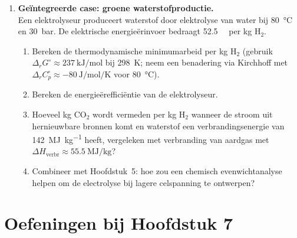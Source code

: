 \begin{enumerate}
\item \textbf{Ge\"integreerde case: groene waterstofproductie.} \\
Een elektrolyseur produceert waterstof door elektrolyse van water bij \SI{80}{\celsius} en \SI{30}{\bar}. De elektrische energie\"erinvoer bedraagt \SI{52.5}{\kilo\watthour} per kg $\mathrm{H_2}$.
\begin{enumerate}
\item[(a)] Bereken de thermodynamische minimumarbeid per kg $\mathrm{H_2}$ (gebruik $\Delta_r G^\circ \approx \SI{237}{\kilo\joule\per\mole}$ bij \SI{298}{\kelvin}; neem een benadering via Kirchhoff met $\Delta_r C_p^\circ \approx -\SI{80}{\joule\per\mole\per\kelvin}$ voor \SI{80}{\celsius}).
\item[(b)] Bereken de energie\"ereffici\"entie van de elektrolyseur.
\item[(c)] Hoeveel kg $\mathrm{CO_2}$ wordt vermeden per kg $\mathrm{H_2}$ wanneer de stroom uit hernieuwbare bronnen komt en waterstof een verbrandingsenergie van \SI{142}{\mega\joule\per\kilogram} heeft, vergeleken met verbranding van aardgas met $\Delta H_{\text{verbr}} \approx \SI{55.5}{\mega\joule\per\kilogram}$?
\item[(d)] Combineer met Hoofdstuk~5: hoe zou een chemisch evenwichtanalyse helpen om de electrolyse bij lagere celspanning te ontwerpen?
\end{enumerate}

\end{enumerate}


\section*{Oefeningen bij Hoofdstuk 7}

